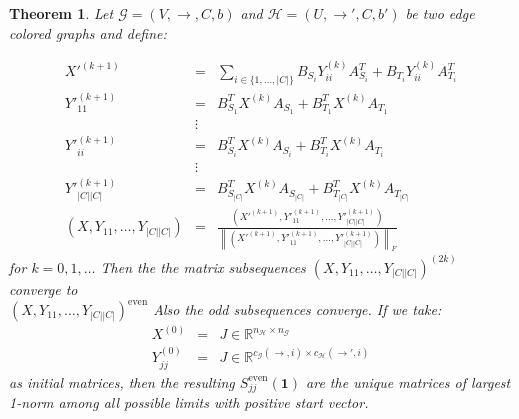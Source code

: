 \documentclass[a4paper,11pt]{report}
\newtheorem{theorem}{Theorem}[section]
\newcommand{\R}{{\mathbb R}}
\newcommand{\graf}{\mathscr{G}}
\newcommand{\grafeen}{\mathscr{H}}
\begin{document}
\begin{theorem}
  Let $\graf = (V, \to, C, b)$ and $\grafeen = (U, \to', C, b')$ be two edge 
  colored graphs and define:
  
 \begin{eqnarray*}
   X'^{(k+1)} &=& \sum_{i \in \{1, \ldots, |C|\}} B_{S_i}Y^{(k)}_{ii} A^T_{S_i} +  B_{T_i}Y^{(k)}_{ii} 
   A^T_{T_i}\\
   Y'^{(k+1)}_{11} &=& B^T_{S_1}X^{(k)}A_{S_1} + B^T_{T_1}X^{(k)}A_{T_1}\\
   &\vdots &\\
   Y'^{(k+1)}_{ii} &=& B^T_{S_i}X^{(k)}A_{S_i} + B^T_{T_i}X^{(k)}A_{T_i}\\
    &\vdots &\\
 Y'^{(k+1)}_{|C||C|} &=& B^T_{S_|C|}X^{(k)}A_{S_|C|} + B^T_{T_|C|}X^{(k)}A_{T_|C|}\\
   (X, Y_{11}, \ldots, Y_{|C||C|}) &=& \frac{\left(X'^{(k+1)},  Y'^{(k+1)}_{11}, \ldots, Y'^{(k+1)}_{|C||C|} 
   \right)}{\left\|\left(X'^{(k+1)},  Y'^{(k+1)}_{11}, \ldots, Y'^{(k+1)}_{|C||C|} 
   \right)\right\|_F}
 \end{eqnarray*}
   for $k = 0, 1, \ldots$
    Then the the matrix subsequences $(X,Y_{11},\ldots,Y_{|C||C|})^{(2k)}$ converge to\\
     $(X,Y_{11},\ldots,Y_{|C||C|})^{\text{even}}$ 
  Also the odd subsequences converge. If we take:
 \begin{eqnarray*}
   X^{(0)}  &=& J \in \R^{n_\grafeen \times n_\graf}\\
   Y^{(0)}_{jj} &=& J \in \R^{c_\graf(\to, i) \times c_\grafeen(\to', 
   i)}
 \end{eqnarray*}
 as initial matrices, then the resulting $S^{\text{even}}_{jj}(\mathbf{1})$ are 
 the unique matrices of largest 1-norm among all possible limits with positive 
 start vector.
\end{theorem}
\end{document}
